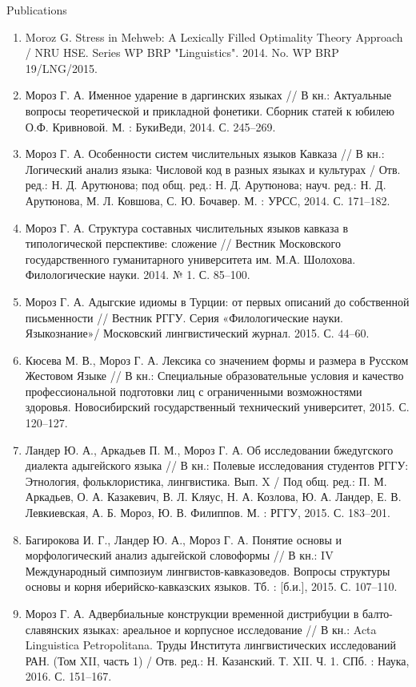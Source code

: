 \documentclass{resume} %
\begin{document}
\begin{rSection}{Publications}
\begin{enumerate}
\item Moroz G. Stress in Mehweb: A Lexically Filled Optimality Theory Approach / NRU HSE. Series WP BRP "Linguistics". 2014. No. WP BRP 19/LNG/2015.
\item Мороз Г. А. Именное ударение в даргинских языках // В кн.: Актуальные вопросы теоретической и прикладной фонетики. Сборник статей к юбилею О.Ф. Кривновой. М. : БукиВеди, 2014. С. 245--269.
\item Мороз Г. А. Особенности систем числительных языков Кавказа // В кн.: Логический анализ языка: Числовой код в разных языках и культурах / Отв. ред.: Н. Д. Арутюнова; под общ. ред.: Н. Д. Арутюнова; науч. ред.: Н. Д. Арутюнова, М. Л. Ковшова, С. Ю. Бочавер. М. : УРСС, 2014. С. 171--182.
\item Мороз Г. А. Структура составных числительных языков кавказа в типологической перспективе: сложение // Вестник Московского государственного гуманитарного университета им. М.А. Шолохова. Филологические науки. 2014. № 1. С. 85--100.
\item Мороз Г. А. Адыгские идиомы в Турции: от первых описаний до собственной письменности // Вестник РГГУ. Серия «Филологические науки. Языкознание»/ Московский лингвистический журнал. 2015. С. 44--60.
\item Кюсева М. В., Мороз Г. А. Лексика со значением формы и размера в Русском Жестовом Языке // В кн.: Специальные образовательные условия и качество профессиональной подготовки лиц с ограниченными возможностями здоровья. Новосибирский государственный технический университет, 2015. С. 120--127.
\item Ландер Ю. А., Аркадьев П. М., Мороз Г. А. Об исследовании бжедугского диалекта адыгейского языка // В кн.: Полевые исследования студентов РГГУ: Этнология, фольклористика, лингвистика. Вып. X / Под общ. ред.: П. М. Аркадьев, О. А. Казакевич, В. Л. Кляус, Н. А. Козлова, Ю. А. Ландер, Е. В. Левкиевская, А. Б. Мороз, Ю. В. Филиппов. М. : РГГУ, 2015. С. 183--201.
\item Багирокова И. Г., Ландер Ю. А., Мороз Г. А. Понятие основы и морфологический анализ адыгейской словоформы // В кн.: IV Международный симпозиум лингвистов-кавказоведов. Вопросы структуры основы и корня иберийско-кавказских языков. Тб. : [б.и.], 2015. С. 107--110.
\item Мороз Г. А. Адвербиальные конструкции временной дистрибуции в балто-славянских языках: ареальное и корпусное исследование // В кн.: Acta Linguistica Petropolitana. Труды Института лингвистических исследований РАН. (Том XII, часть 1) / Отв. ред.: Н. Казанский. Т. XII. Ч. 1. СПб. : Наука, 2016. С. 151--167.

\end{enumerate}
\end{rSection}
\end{document}
